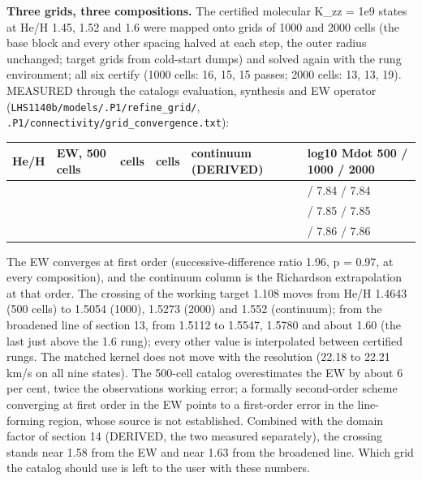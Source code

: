\documentclass[english,a4paper]{my_memo}
\begin{document}
\textbf{Three grids, three compositions.} The certified molecular K\_zz = 1e9
states at He/H 1.45, 1.52 and 1.6 were mapped onto grids of 1000 and 2000
cells (the base block and every other spacing halved at each step, the outer
radius unchanged; target grids from cold-start dumps) and solved again with
the rung environment; all six certify (1000 cells: 16, 15, 15 passes; 2000
cells: 13, 13, 19). MEASURED through the catalog\textquotesingle s evaluation, synthesis and
EW operator (\texttt{LHS1140b/models/.P1/refine\_grid/},
\texttt{.P1/connectivity/grid\_convergence.txt}):

{\def\LTcaptype{none} %
{\small
\begin{longtable}[]{@{}>{\raggedright\arraybackslash}p{\dimexpr(\linewidth-12\tabcolsep)/6\relax}>{\raggedright\arraybackslash}p{\dimexpr(\linewidth-12\tabcolsep)/6\relax}>{\raggedright\arraybackslash}p{\dimexpr(\linewidth-12\tabcolsep)/6\relax}>{\raggedright\arraybackslash}p{\dimexpr(\linewidth-12\tabcolsep)/6\relax}>{\raggedright\arraybackslash}p{\dimexpr(\linewidth-12\tabcolsep)/6\relax}>{\raggedright\arraybackslash}p{\dimexpr(\linewidth-12\tabcolsep)/6\relax}@{}}
\toprule\noalign{}
He/H & EW, 500 cells & 1000 cells & 2000 cells & continuum (DERIVED) & log10 Mdot 500 / 1000 / 2000 \\
\midrule\noalign{}
\endhead
\bottomrule\noalign{}
\endlastfoot
1.45 & 1.0964 & 1.0640 & 1.0475 & 1.030 & 7.85 / 7.84 / 7.84 \\
1.52 & 1.1532 & 1.1196 & 1.1025 & 1.085 & 7.86 / 7.85 / 7.85 \\
1.6 & 1.2155 & 1.1804 & 1.1625 & 1.144 & 7.86 / 7.86 / 7.86 \\
\end{longtable}
}
}

The EW converges at first order (successive-difference ratio 1.96, p = 0.97,
at every composition), and the continuum column is the Richardson
extrapolation at that order. The crossing of the working target 1.108 moves
from He/H 1.4643 (500 cells) to 1.5054 (1000), 1.5273 (2000) and 1.552
(continuum); from the broadened line of section 13, from 1.5112 to 1.5547,
1.5780 and about 1.60 (the last just above the 1.6 rung); every other value is
interpolated between certified rungs. The matched kernel does not move with
the resolution (22.18 to 22.21 km/s on all nine states). The 500-cell catalog
overestimates the EW by about 6 per cent, twice the observation\textquotesingle s working
error; a formally second-order scheme converging at first order in the EW
points to a first-order error in the line-forming region, whose source is not
established. Combined with the domain factor of section 14 (DERIVED, the two
measured separately), the crossing stands near 1.58 from the EW and near 1.63
from the broadened line. Which grid the catalog should use is left to the
user with these numbers.
\end{document}

